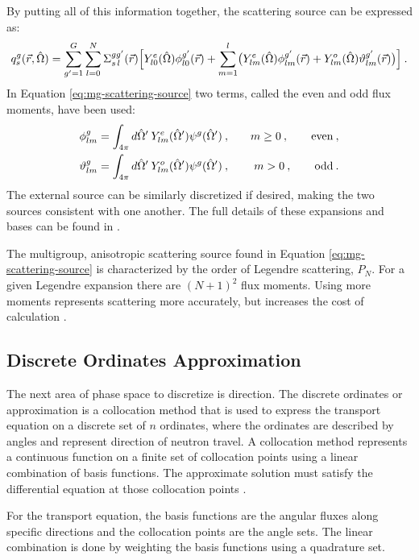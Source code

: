 By putting all of this information together, the scattering source can be expressed as: 
%
\begin{equation}
  q^g_{s} (\vec{r}, \hat{\Omega}) = \sum_{g'=1}^G \sum_{l=0}^N \Sigma^{gg'}_{s\,l}(\vec{r}) \Bigl[ Y^e_{l0}(\hat{\Omega}) \phi^{g'}_{l0}(\vec{r}) + \sum_{m=1}^l \bigl( Y^e_{lm}(\hat{\Omega}) \phi^{g'}_{lm}(\vec{r}) + Y^o_{lm}(\hat{\Omega}) \vartheta^{g'}_{lm}(\vec{r}) \bigr) \Bigr]\:.
   \label{eq:mg-scattering-source}
\end{equation}
%
In Equation \eqref{eq:mg-scattering-source} two terms, called the even and odd flux moments, have been used:
%
\begin{alignat}{3}
  \phi^g_{lm} &= \int_{4\pi} d\hat{\Omega}' \:Y^e_{lm}(\hat{\Omega}') \psi^g(\hat{\Omega}') \:, \quad& m\ge 0\:,\qquad \text{even} \:, \label{eq:even-flux}\\
  \vartheta^g_{lm} &= \int_{4\pi} d\hat{\Omega}' \:Y^o_{lm}(\hat{\Omega}')\psi^g(\hat{\Omega}') \:, \quad& m>0 \:,  \qquad \text{odd} \label{eq:odd-flux} \:.
\end{alignat}
%
The external source can be similarly discretized if desired, making the two sources consistent with one another. The full details of these expansions and bases can be found in \cite{Evans2009}. 

The multigroup, anisotropic scattering source found in Equation \eqref{eq:mg-scattering-source} is characterized by the order of Legendre scattering, $P_{N}$. For a given Legendre expansion there are $(N + 1)^{2}$ flux moments. Using more moments represents scattering more accurately, but increases the cost of calculation \cite{Evans2009}.  

\subsection{Discrete Ordinates Approximation}
The next area of phase space to discretize is direction. The discrete ordinates or \Sn approximation is a collocation method that is used to express the transport equation on a discrete set of $n$ ordinates, where the ordinates are described by angles and represent direction of neutron travel. A collocation method represents a continuous function on a finite set of collocation points using a linear combination of basis functions. The approximate solution must satisfy the differential equation at those collocation points \cite{Heath2002}. 

For the transport equation, the basis functions are the angular fluxes along specific directions and the collocation points are the angle sets. The linear combination is done by weighting the basis functions using a quadrature set. 

